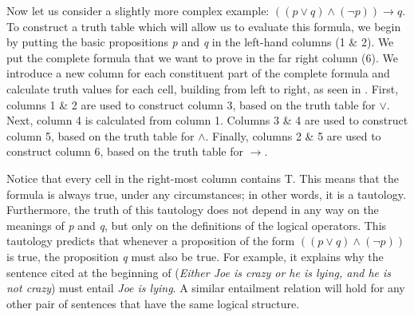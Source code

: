 Now let us consider a slightly more complex example: $((p\vee q) \wedge (\neg p)) \rightarrow q$. To construct a truth table which will allow us to evaluate this formula, we begin by putting the basic propositions \textit{p} and \textit{q} in the left-hand columns (1 \& 2). We put the complete formula that we want to prove in the far right column (6). We introduce a new column for each constituent part of the complete formula and calculate truth values for each cell, building from left to right, as seen in . First, columns 1 \& 2 are used to construct column 3, based on the truth table for {$\vee$}. Next, column 4 is calculated from column 1. Columns 3 \& 4 are used to construct column 5, based on the truth table for {$\wedge$}. Finally, columns 2 \& 5 are used to construct column 6, based on the truth table for $\rightarrow$.



Notice that every cell in the right-most column contains T. This means that the formula is always true, under any circumstances; in other words, it is a tautology. Furthermore, the truth of this tautology does not depend in any way on the meanings of \textit{p} and \textit{q}, but only on the definitions of the logical operators. This tautology predicts that whenever a proposition of the form $((p\vee q) \wedge (\neg p))$ is true, the proposition \textit{q} must also be true. For example, it explains why the sentence cited at the beginning of  (\textit{Either Joe is crazy or he is lying, and he is not crazy}) must entail \textit{Joe is lying}. A similar entailment relation will hold for any other pair of sentences that have the same logical structure.


